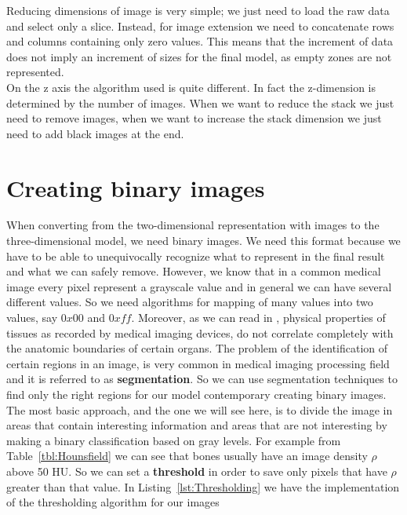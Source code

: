 Reducing dimensions of image is very simple; we just need to load the raw data and select only a slice. Instead, for image extension we need to concatenate rows and columns containing only zero values. This means that the increment of data does not imply an increment of sizes for the final model, as empty zones are not represented.\\

On the z axis the algorithm used is quite different. In fact the z-dimension is determined by the number of images. When we want to reduce the stack we just need to remove images, when we want to increase the stack dimension we just need to add black images at the end.

\section{Creating binary images}\label{sec32:BinaryImages}

When converting from the two-dimensional representation with images to the three-dimensional model, we need binary images. We need this format because we have to be able to unequivocally recognize what to represent in the final result and what we can safely remove. However, we know that in a common medical image every pixel represent a grayscale value and in general we can have several different values. So we need algorithms for mapping of many values into two values, say $0x00$ and $0xff$. 
Moreover, as we can read in \cite{Birkfellner}, physical properties of tissues as recorded by medical imaging devices, do not correlate completely with the anatomic boundaries of certain organs. The problem of the identification of certain regions in an image, is very common in medical imaging processing field and it is referred to as \textbf{segmentation}. So we can use segmentation techniques to find only the right regions for our model contemporary creating binary images.\\

The most basic approach, and the one we will see here, is to divide the image in areas that contain interesting information and areas that are not interesting by making a binary classification based on gray levels. For example from Table~\ref{tbl:Hounsfield} we can see that bones usually have an image density $\rho$ above 50 HU. So we can set a \textbf{threshold} in order to save only pixels that have $\rho$ greater than that value. In Listing~\ref{lst:Thresholding} we have the implementation of the thresholding algorithm for our images


